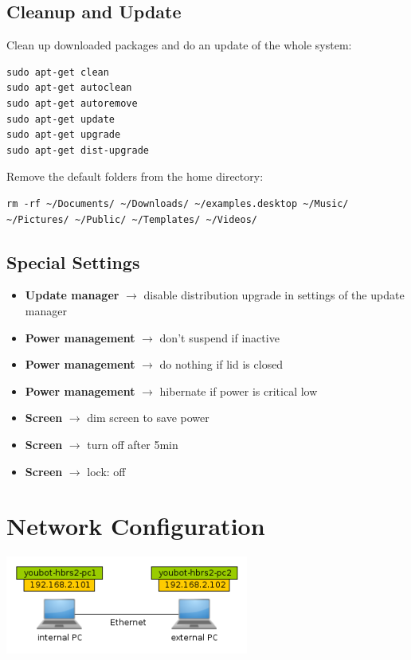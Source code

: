 \documentclass[a4paper,12pt]{article}
\begin{document}
\subsection{Cleanup and Update}
Clean up downloaded packages and do an update of the whole system:
\begin{lstlisting}
sudo apt-get clean
sudo apt-get autoclean
sudo apt-get autoremove
sudo apt-get update
sudo apt-get upgrade
sudo apt-get dist-upgrade 
\end{lstlisting}

Remove the default folders from the home directory:
\begin{lstlisting}
rm -rf ~/Documents/ ~/Downloads/ ~/examples.desktop ~/Music/ ~/Pictures/ ~/Public/ ~/Templates/ ~/Videos/
\end{lstlisting}


\subsection{Special Settings}
\begin{itemize}
	\item \textbf{Update manager} $\rightarrow$ disable distribution upgrade in settings of the update manager
	\item \textbf{Power management} $\rightarrow$ don't suspend if inactive	
	\item \textbf{Power management} $\rightarrow$ do nothing if lid is closed
	\item \textbf{Power management} $\rightarrow$ hibernate if power is critical low
	\item \textbf{Screen} $\rightarrow$ dim screen to save power
	\item \textbf{Screen} $\rightarrow$ turn off after 5min
	\item \textbf{Screen} $\rightarrow$ lock: off	
\end{itemize}



\newpage
\section{Network Configuration}
\begin{center}
	\includegraphics[width=0.60\textwidth]{gfx/network.png}
\end{center}
\end{document}
